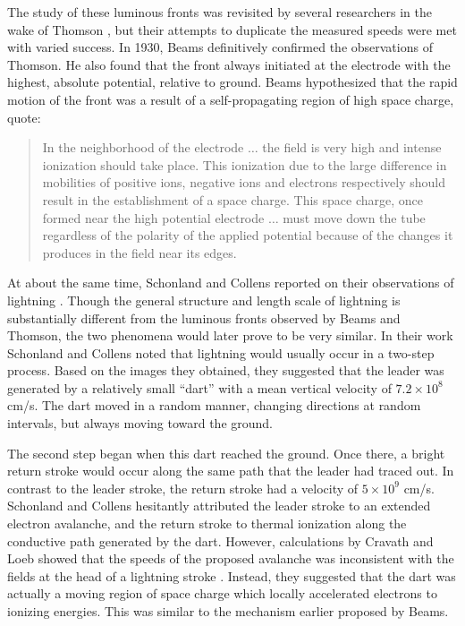 The study of these luminous fronts was revisited by several researchers in the
wake of Thomson \cite{James1904, Whiddington1925, Beams1926}, but their attempts
to duplicate the measured speeds were met with varied success. In 1930, Beams
definitively confirmed the observations of Thomson. He also found that the front
always initiated at the electrode with the highest, absolute potential, relative
to ground. Beams hypothesized that the rapid motion of the front was a result of
a self-propagating region of high space charge, quote:
\begin{quote}
  In the neighborhood of the electrode $\ldots$ the field is very high and
  intense ionization should take place. This ionization due to the large
  difference in mobilities of positive ions, negative ions and electrons
  respectively should result in the establishment of a space charge. This space
  charge, once formed near the high potential electrode $\ldots$ must move
  down the tube regardless of the polarity of the applied potential because of
  the changes it produces in the field near its edges.
\end{quote}

At about the same time, Schonland and Collens reported on their observations of
lightning \cite{Schonland1933}. Though the general structure and length scale of
lightning is substantially different from the luminous fronts observed by Beams
and Thomson, the two phenomena would later prove to be very similar. In their
work Schonland and Collens noted that lightning would usually occur in a
two-step process. Based on the images they obtained, they suggested that
the leader was generated by a relatively small ``dart'' with a mean vertical
velocity of $7.2\times10^8$ cm/s. The dart moved in a random manner, changing
directions at random intervals, but always moving toward the ground.

The second step began when this dart reached the ground. Once there, a bright
return stroke would occur along the same path that the leader had traced out. In
contrast to the leader stroke, the return stroke had a velocity of $5\times10^9$
cm/s. Schonland and Collens hesitantly attributed the leader stroke to an
extended electron avalanche, and the return stroke to thermal ionization along
the conductive path generated by the dart. However, calculations by Cravath and
Loeb showed that the speeds of the proposed avalanche was inconsistent with the
fields at the head of a lightning stroke \cite{Cravath1935}. Instead, they
suggested that the dart was actually a moving region of space charge which
locally accelerated electrons to ionizing energies. This was similar to the
mechanism earlier proposed by Beams.

